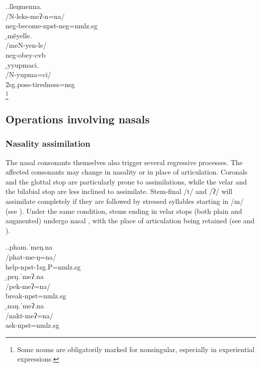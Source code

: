 \ex.\a.\glll lleŋmenna.\\
		/N-leks-meʔ-n=na/\\
		{\sc neg-}become{\sc [3sg]-npst-neg=nmlz.sg}\\
		\b.\glll mẽyelle.\\
		/meN-yen-le/\\
		{\sc neg-}obey{\sc -cvb}\\
		\b.\glll yyupmaci.\\
		/N-yupma=ci/\\
		{\sc 2sg.poss-}tiredness{\sc =nsg}\\
		\footnote{Some nouns are obligatorily marked for nonsingular, especially in experiential expressions.}


\subsection{Operations involving nasals}\label{nas-strat}			

\subsubsection{Nasality  assimilation}
		
The nasal consonants themselves also trigger several regressive  processes. The affected consonants may change in nasality or in place of articulation. Coronals and the glottal stop are particularly prone to assimilations, while the velar and the bilabial stop are less inclined to assimilate. Stem-final /t/ and /ʔ/ will assimilate completely if they are followed by stressed syllables starting in /m/ (see \Next[a]). Under the same condition, stems ending in velar stops (both plain and augmented) undergo nasal ,  with the place of articulation being retained (see \Next[b] and \Next[c]).

\ex.\a.\glll pham.ˈmeŋ.na\\
/phat-me-ŋ=na/\\
help{\sc [3sg.A]-npst-1sg.P=nmlz.sg}\\
\b.\glll  peŋ.ˈmeʔ.na\\
/pek-meʔ=na/\\
break{\sc [3sg]-npst=nmlz.sg}\\
\b.\glll  naŋ.ˈmeʔ.na\\
/nakt-meʔ=na/\\
ask{\sc [3sg]-npst=nmlz.sg}\\

